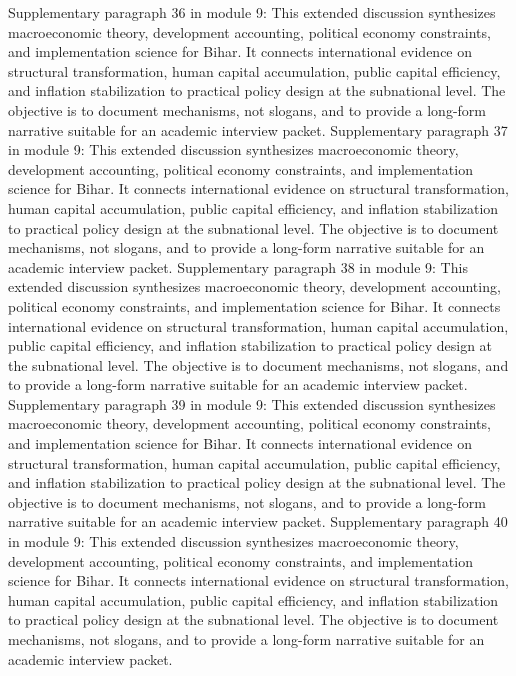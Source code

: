 \documentclass[preprint,12pt]{elsarticle}
\begin{document}
Supplementary paragraph 36 in module 9: This extended discussion synthesizes macroeconomic theory, development accounting, political economy constraints, and implementation science for Bihar. It connects international evidence on structural transformation, human capital accumulation, public capital efficiency, and inflation stabilization to practical policy design at the subnational level. The objective is to document mechanisms, not slogans, and to provide a long-form narrative suitable for an academic interview packet.
Supplementary paragraph 37 in module 9: This extended discussion synthesizes macroeconomic theory, development accounting, political economy constraints, and implementation science for Bihar. It connects international evidence on structural transformation, human capital accumulation, public capital efficiency, and inflation stabilization to practical policy design at the subnational level. The objective is to document mechanisms, not slogans, and to provide a long-form narrative suitable for an academic interview packet.
Supplementary paragraph 38 in module 9: This extended discussion synthesizes macroeconomic theory, development accounting, political economy constraints, and implementation science for Bihar. It connects international evidence on structural transformation, human capital accumulation, public capital efficiency, and inflation stabilization to practical policy design at the subnational level. The objective is to document mechanisms, not slogans, and to provide a long-form narrative suitable for an academic interview packet.
Supplementary paragraph 39 in module 9: This extended discussion synthesizes macroeconomic theory, development accounting, political economy constraints, and implementation science for Bihar. It connects international evidence on structural transformation, human capital accumulation, public capital efficiency, and inflation stabilization to practical policy design at the subnational level. The objective is to document mechanisms, not slogans, and to provide a long-form narrative suitable for an academic interview packet.
Supplementary paragraph 40 in module 9: This extended discussion synthesizes macroeconomic theory, development accounting, political economy constraints, and implementation science for Bihar. It connects international evidence on structural transformation, human capital accumulation, public capital efficiency, and inflation stabilization to practical policy design at the subnational level. The objective is to document mechanisms, not slogans, and to provide a long-form narrative suitable for an academic interview packet.
\end{document}
